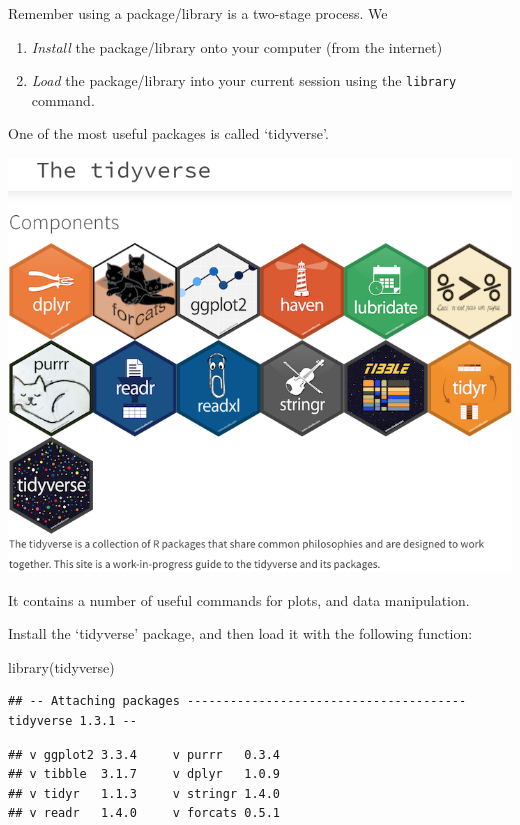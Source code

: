 \documentclass[]{article}
\newenvironment{Shaded}{\begin{snugshade}}{\end{snugshade}}
\newcommand{\FunctionTok}[1]{\textcolor[rgb]{0.00,0.00,0.00}{#1}}
\newcommand{\NormalTok}[1]{#1}
\providecommand{\tightlist}{%
  \setlength{\itemsep}{0pt}\setlength{\parskip}{0pt}}
\begin{document}
Remember using a package/library is a two-stage process. We

\begin{enumerate}
\def\labelenumi{\arabic{enumi}.}
\tightlist
\item
  \emph{Install} the package/library onto your computer (from the
  internet)
\item
  \emph{Load} the package/library into your current session using the
  \texttt{library} command.
\end{enumerate}

One of the most useful packages is called `tidyverse'.

\includegraphics{tidyverse.png}

It contains a number of useful commands for plots, and data
manipulation.

Install the `tidyverse' package, and then load it with the following
function:

\begin{Shaded}
\begin{Highlighting}[]
\FunctionTok{library}\NormalTok{(tidyverse)}
\end{Highlighting}
\end{Shaded}

\begin{verbatim}
## -- Attaching packages --------------------------------------- tidyverse 1.3.1 --
\end{verbatim}

\begin{verbatim}
## v ggplot2 3.3.4     v purrr   0.3.4
## v tibble  3.1.7     v dplyr   1.0.9
## v tidyr   1.1.3     v stringr 1.4.0
## v readr   1.4.0     v forcats 0.5.1
\end{verbatim}
\end{document}
